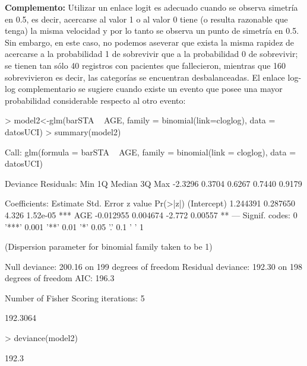 \documentclass[11pt,onside]{article}
\begin{document}
\begin{itemize}
\textbf{Complemento:} Utilizar un enlace logit es adecuado cuando se observa simetría en 0.5, es decir, acercarse al valor 1 o al valor 0 tiene (o resulta razonable que tenga) la misma velocidad y por lo tanto se observa un punto de simetría en 0.5. Sin embargo, en este caso, no podemos aseverar que exista la misma rapidez de acercarse a la probabilidad 1 de sobrevivir que a la probabilidad 0 de sobrevivir; se tienen tan sólo 40 registros con pacientes que fallecieron, mientras que 160 sobrevivieron es decir, las categorías se encuentran desbalanceadas. El enlace log-log complementario se sugiere cuando existe un evento que posee una mayor probabilidad considerable respecto al otro evento:

\begin{Schunk}
\begin{Sinput}
> model2<-glm(barSTA ~ AGE, family = binomial(link=cloglog), data = datosUCI)
> summary(model2)   
\end{Sinput}
\begin{Soutput}
Call:
glm(formula = barSTA ~ AGE, family = binomial(link = cloglog), 
    data = datosUCI)

Deviance Residuals: 
    Min       1Q   Median       3Q      Max  
-2.3296   0.3704   0.6267   0.7440   0.9179  

Coefficients:
             Estimate Std. Error z value Pr(>|z|)    
(Intercept)  1.244391   0.287650   4.326 1.52e-05 ***
AGE         -0.012955   0.004674  -2.772  0.00557 ** 
---
Signif. codes:  0 '***' 0.001 '**' 0.01 '*' 0.05 '.' 0.1 ' ' 1

(Dispersion parameter for binomial family taken to be 1)

    Null deviance: 200.16  on 199  degrees of freedom
Residual deviance: 192.30  on 198  degrees of freedom
AIC: 196.3

Number of Fisher Scoring iterations: 5
\end{Soutput}
\begin{Soutput}
[1] 192.3064
\end{Soutput}
\begin{Sinput}
> deviance(model2)
\end{Sinput}
\begin{Soutput}
[1] 192.3
\end{Soutput}
\end{Schunk}



\end{itemize}
\end{document}
